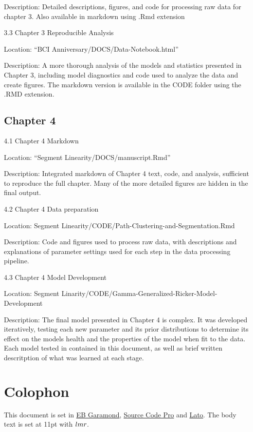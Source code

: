 \documentclass[twoside,12pt,final]{ucthesis-CA2012}
\begin{document}
\begin{ucmainmatter}
Description: Detailed descriptions, figures, and code for processing raw data for chapter 3. Also available in markdown using .Rmd extension

3.3 Chapter 3 Reproducible Analysis

Location: ``BCI Anniversary/DOCS/Data-Notebook.html''

Description: A more thorough analysis of the models and statistics presented in Chapter 3, including model diagnostics and code used to analyze the data and create figures. The markdown version is available in the CODE folder using the .RMD extension.

\hypertarget{chapter-4}{%
\section{Chapter 4}\label{chapter-4}}

4.1 Chapter 4 Markdown

Location: ``Segment Linearity/DOCS/manuscript.Rmd''

Description: Integrated markdown of Chapter 4 text, code, and analysis, sufficient to reproduce the full chapter. Many of the more detailed figures are hidden in the final output.

4.2 Chapter 4 Data preparation

Location: Segment Linearity/CODE/Path-Clustering-and-Segmentation.Rmd

Description: Code and figures used to process raw data, with descriptions and explanations of parameter settings used for each step in the data processing pipeline.

4.3 Chapter 4 Model Development

Location: Segment Linarity/CODE/Gamma-Generalized-Ricker-Model-Development

Description: The final model presented in Chapter 4 is complex. It was developed iteratively, testing each new parameter and its prior distributions to determine its effect on the models health and the properties of the model when fit to the data. Each model tested in contained in this document, as well as brief written descritption of what was learned at each stage.

\hypertarget{colophon}{%
\chapter*{Colophon}\label{colophon}}

This document is set in \href{https://github.com/georgd/EB-Garamond}{EB Garamond}, \href{https://github.com/adobe-fonts/source-code-pro/}{Source Code Pro} and \href{http://www.latofonts.com/lato-free-fonts/}{Lato}. The body text is set at 11pt with \(\familydefault\).


\end{ucmainmatter}
\end{document}
